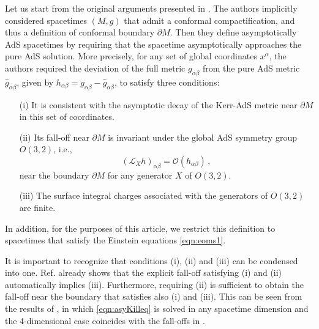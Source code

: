 \documentclass[aps,letterpaper,twocolumn,nofootinbib]{revtex4}
\numberwithin{equation}{section}
\begin{document}
Let us start from the original arguments presented in \cite{Henneaux:1985tv}. 
The authors implicitly considered spacetimes $(M,g)$ that admit a conformal compactification, and thus a definition of conformal boundary $\partial M$.
Then they define asymptotically AdS spacetimes by requiring that the spacetime asymptotically approaches the pure AdS solution.
More precisely, for any set of global coordinates $x^\alpha$, the authors required the deviation of the full metric $g_{\alpha\beta}$ from the pure AdS metric $\hat{g}_{\alpha\beta}$, given by $h_{\alpha\beta}=g_{\alpha\beta}-\hat{g}_{\alpha\beta}$, to satisfy three conditions:

\begin{enumerate}
\item[(i)] It is consistent with the asymptotic decay of the Kerr-AdS metric near $\partial M$ in this set of coordinates.
\item[(ii)] Its fall-off near $\partial M$ is invariant under the global AdS symmetry group $O(3,2)$, i.e.,
\begin{equation}\label{eqn:asyKilleq}
(\mathcal{L}_X h)_{\alpha\beta}=\mathcal{O}(h_{\alpha\beta})\,,
\end{equation}
near the boundary $\partial M$ for any generator $X$ of $O(3,2)$.
\item[(iii)] The surface integral charges associated with the generators of $O(3,2)$ are finite.
\end{enumerate}
In addition, for the purposes of this article, we restrict this definition to spacetimes that satisfy the Einstein equations \eqref{eqn:eoms1}.

It is important to recognize that conditions (i), (ii) and (iii) can be condensed into one. Ref. \cite{Henneaux:1985tv} already shows that the explicit fall-off satisfying (i) and (ii) automatically implies (iii). 
Furthermore, requiring (ii) is sufficient to obtain the fall-off near the boundary that satisfies also (i) and (iii). 
This can be seen from the results of \cite{Henneaux:2006hk}, in which \eqref{eqn:asyKilleq} is solved in any spacetime dimension and the 4-dimensional case coincides with the fall-offs in \cite{Henneaux:1985tv}.
\end{document}
